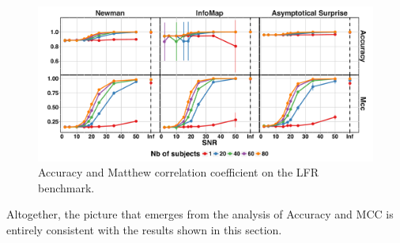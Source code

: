 \begin{figure}[htb!]
\centering
\includegraphics[width=\textwidth]{images/figure4_supplementary.pdf}
\caption{Accuracy and Matthew correlation coefficient on the LFR benchmark.}
\label{fig:accmcclfr}
\end{figure}

Altogether, the picture that emerges from the analysis of Accuracy and MCC is entirely consistent with the results shown in this section.

